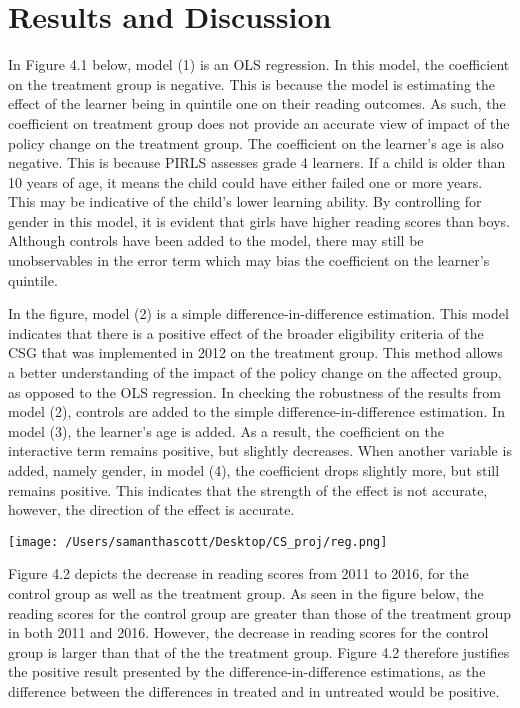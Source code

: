 \documentclass[11pt,preprint, authoryear]{elsarticle}
\let\origfigure\figure
\let\endorigfigure\endfigure
\renewenvironment{figure}[1][2] {
    \expandafter\origfigure\expandafter[H]
} {
    \endorigfigure
}
\numberwithin{equation}{section}
\numberwithin{figure}{section}
\numberwithin{table}{section}
\begin{document}
\hypertarget{results-and-discussion}{%
\section{Results and Discussion}\label{results-and-discussion}}

In Figure 4.1 below, model (1) is an OLS regression. In this model, the
coefficient on the treatment group is negative. This is because the
model is estimating the effect of the learner being in quintile one on
their reading outcomes. As such, the coefficient on treatment group does
not provide an accurate view of impact of the policy change on the
treatment group. The coefficient on the learner's age is also negative.
This is because PIRLS assesses grade 4 learners. If a child is older
than 10 years of age, it means the child could have either failed one or
more years. This may be indicative of the child's lower learning
ability. By controlling for gender in this model, it is evident that
girls have higher reading scores than boys. Although controls have been
added to the model, there may still be unobservables in the error term
which may bias the coefficient on the learner's quintile.

In the figure, model (2) is a simple difference-in-difference
estimation. This model indicates that there is a positive effect of the
broader eligibility criteria of the CSG that was implemented in 2012 on
the treatment group. This method allows a better understanding of the
impact of the policy change on the affected group, as opposed to the OLS
regression. In checking the robustness of the results from model (2),
controls are added to the simple difference-in-difference estimation. In
model (3), the learner's age is added. As a result, the coefficient on
the interactive term remains positive, but slightly decreases. When
another variable is added, namely gender, in model (4), the coefficient
drops slightly more, but still remains positive. This indicates that the
strength of the effect is not accurate, however, the direction of the
effect is accurate.

\begin{figure}
\centering
\texttt{[image: /Users/samanthascott/Desktop/CS\_proj/reg.png]}
\caption{Regression Table}
\end{figure}

Figure 4.2 depicts the decrease in reading scores from 2011 to 2016, for
the control group as well as the treatment group. As seen in the figure
below, the reading scores for the control group are greater than those
of the treatment group in both 2011 and 2016. However, the decrease in
reading scores for the control group is larger than that of the the
treatment group. Figure 4.2 therefore justifies the positive result
presented by the difference-in-difference estimations, as the difference
between the differences in treated and in untreated would be positive.
\end{document}
